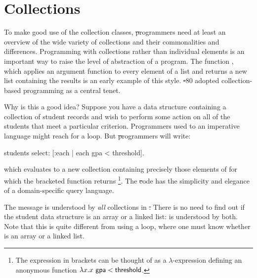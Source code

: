 \documentclass[a4paper,10pt,twoside]{book}
\begin{document}
	\renewcommand{\nnbb}[2]{} %
\fi
\chapter{Collections}
\label{cha:collections}


To make good use of the collection classes, \st programmers need at least an overview of the wide variety of collections and their commonalities and differences.
%
Programming with collections rather than individual elements is an important way to raise the level of abstraction of a program.
The  function , which applies an argument function to every element of a list and returns a new list containing the results is an early example of this style. \st-80 adopted collection-based programming as a central tenet.


Why is this a good idea?
Suppose you have a data structure containing a collection of student records and wish to perform some action on all of the students that meet a particular criterion.
Programmers used to an imperative language might reach for a loop.
But \st programmers will write:
\begin{code}{}
students select: [:each | each gpa < threshold].
\end{code}
\noindent
which evaluates to a new collection containing precisely those elements of  for which the bracketed function returns \footnote{The expression in brackets can be thought of as a $\lambda$-expression defining an anonymous function $\lambda x. x~{\sf gpa} < {\sf threshold}$.
}.
The \st code has the simplicity and elegance of a domain-specific query language.

The message  is understood by \emph{all} collections in \st.
There is no need to find out if the student data structure is an array or a linked list:
 is understood by both.
Note that this is quite different from using a loop, where one must know whether  is an array or a linked list.
\end{document}
